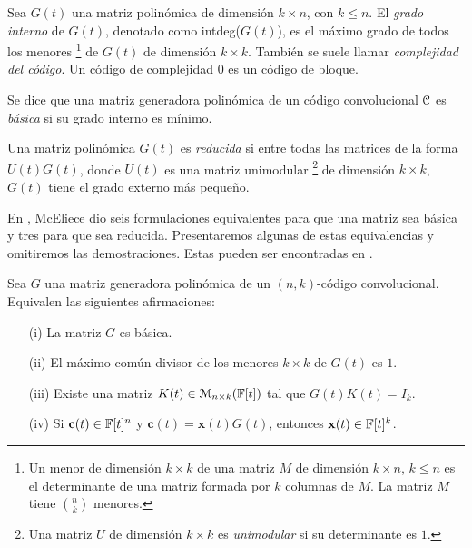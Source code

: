 \begin{definicion}\label{def:complejidad}
Sea $G(t)$ una matriz polinómica de dimensión $k\times n$, con $k \leq n$. El \emph{grado interno} de $G(t)$, denotado como intdeg($G(t)$), es el máximo grado de todos los menores \footnote{Un menor de dimensión $k \times k$ de una matriz $M$ de dimensión $k \times n$, $k \leq n$ es el determinante de una matriz formada por $k$ columnas de $M$. La matriz $M$ tiene $\binom{n}{k}$ menores.} de $G(t)$ de dimensión $k \times k$. También se suele llamar \emph{complejidad del código}. Un código de complejidad $0$ es un código de bloque.
\end{definicion}

\begin{definicion}
Se dice que una matriz generadora polinómica de un código convolucional $\mathcal C$ es \emph{básica} si su grado interno es mínimo.
\end{definicion}

\begin{definicion}
Una matriz polinómica $G(t)$ es \emph{reducida} si entre todas las matrices de la forma $U(t)G(t)$, donde $U(t)$ es una matriz unimodular \footnote{Una matriz $U$ de dimensión $k \times k$ es \emph{unimodular} si su determinante es $1$.} de dimensión $k \times k$, $G(t)$ tiene el grado externo más pequeño.
\end{definicion}

En \cite{mceliece1998}, McEliece dio seis formulaciones equivalentes para que una matriz sea básica y tres para que sea reducida. Presentaremos algunas de estas equivalencias y omitiremos las demostraciones. Estas pueden ser encontradas en \cite[Apéndice A]{mceliece1998}.

\begin{teorema}
\label{th:cc1}
Sea $G$ una matriz generadora polinómica de un $(n,k)$-código convolucional. Equivalen las siguientes afirmaciones:
\begin{itemize}
    \item[(i)] La matriz $G$ es básica.
    \item[(ii)] El máximo común divisor de los menores $k \times k$ de $G(t)$ es $1$.
    \item[(iii)] Existe una matriz $K(t) \in \mathcal{M}_{n \times k}(\mathbb{F}[t])$ tal que $G(t)K(t) = I_k$.
    \item[(iv)] Si $\mathbf{c}(t) \in \mathbb{F}[t]^n$ y $\mathbf{c}(t) = \mathbf{x}(t)G(t)$, entonces $\mathbf{x}(t) \in \mathbb{F}[t]^k$.
\end{itemize}
\end{teorema}

